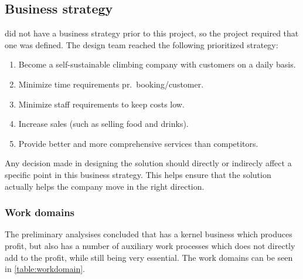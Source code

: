 \subsection{Business strategy}
\gomonkey{} did not have a business strategy prior to this project, so the project 
required that one was defined. The design team reached the following prioritized 
strategy: 

\begin{enumerate}
	\item Become a self-sustainable climbing company with customers on a daily basis.
	\item Minimize time requirements pr.\ booking/customer.
	\item Minimize staff requirements to keep costs low.
	\item Increase sales (such as selling food and drinks).
	\item Provide better and more comprehensive services than competitors.
\end{enumerate}

Any decision made in designing the solution should directly or indirecly affect a
specific point in this business strategy. This helps ensure that the solution
actually helps the company move in the right direction.


\subsubsection{Work domains}
The preliminary analysises concluded that \gomonkey{} has a kernel business
which produces profit, but also has a number of auxiliary work processes 
which does not directly add to the profit, while still being very essential.
The work domains can be seen in \autoref{table:workdomain}.

